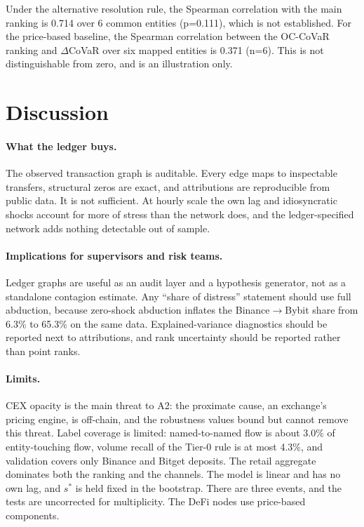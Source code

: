 \documentclass[referee,pdflatex,sn-mathphys-ay]{sn-jnl}
\theoremstyle{thmstyleone}%
\theoremstyle{thmstyletwo}%
\theoremstyle{thmstylethree}%
\begin{document}
Under the alternative resolution rule, the Spearman correlation with the main ranking is 0.714 over 6 common entities
(p=0.111), which is not established. For the price-based baseline, the Spearman correlation between the OC-CoVaR ranking and
$\Delta$CoVaR over six mapped entities is 0.371 (n=6). This is not distinguishable from zero, and is an illustration only.

\section{Discussion}
\label{sec:discussion}

\paragraph{What the ledger buys.} The observed transaction graph is auditable. Every edge maps to inspectable transfers, structural
zeros are exact, and attributions are reproducible from public data. It is not sufficient. At hourly scale the own lag and idiosyncratic
shocks account for more of stress than the network does, and the ledger-specified network adds nothing detectable out of sample.

\paragraph{Implications for supervisors and risk teams.} Ledger graphs are useful as an audit layer and a hypothesis generator, not as a
standalone contagion estimate. Any ``share of distress'' statement should use full abduction, because zero-shock abduction inflates
the Binance$\to$Bybit share from 6.3\% to 65.3\% on the same data. Explained-variance diagnostics should be
reported next to attributions, and rank uncertainty should be reported rather than point ranks.

\paragraph{Limits.} CEX opacity is the main threat to A2: the proximate cause, an exchange's pricing engine, is off-chain, and the
robustness values bound but cannot remove this threat. Label coverage is limited: named-to-named flow is about 3.0\% of
entity-touching flow, volume recall of the Tier-0 rule is at most 4.3\%, and validation covers only Binance and Bitget deposits.
The retail aggregate dominates both the ranking and the channels. The model is linear and has no own lag, and $s^\ast$ is held fixed
in the bootstrap. There are three events, and the tests are uncorrected for multiplicity. The DeFi nodes use price-based components.
\end{document}
